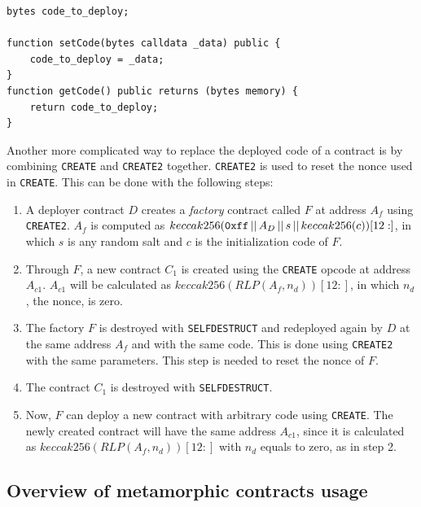\begin{lstlisting}[label={lst:meta-2},caption={Pseudo code of a contract that gives the code to deploy.}]
bytes code_to_deploy;

function setCode(bytes calldata _data) public {
    code_to_deploy = _data;
}
function getCode() public returns (bytes memory) {
    return code_to_deploy;
}
\end{lstlisting}

Another more complicated way to replace the deployed code of a contract is by combining {\tt CREATE} and {\tt CREATE2} together. {\tt CREATE2} is used to reset the nonce used in {\tt CREATE}. This can be done with the following steps:

\begin{enumerate}
    \item A deployer contract $D$ creates a \textit{factory} contract called $F$ at address $A_{f}$ using {\tt CREATE2}. $A_{f}$ is computed as $keccak256({\tt 0xff}\,||\,A_D\,||\,s\,||\,keccak256(c))[12:]$, in which $s$ is any random salt and $c$ is the initialization code of $F$.  

    \item Through $F$, a new contract $C_1$ is created using the {\tt CREATE} opcode at address $A_{c1}$. $A_{c1}$ will be calculated as $keccak256(RLP(A_f,n_d))[12:]$, in which $n_d$, the nonce, is zero.

    \item The factory $F$ is destroyed with {\tt SELFDESTRUCT} and redeployed again by $D$ at the same address $A_f$ and with the same code. This is done using {\tt CREATE2} with the same parameters. This step is needed to reset the nonce of $F$.

    \item The contract $C_1$ is destroyed with {\tt SELFDESTRUCT}.

    \item Now, $F$ can deploy a new contract with arbitrary code using {\tt CREATE}. The newly created contract will have the same address $A_{c1}$, since it is calculated as $keccak256(RLP(A_f,n_d))[12:]$ with $n_d$ equals to zero, as in step 2. 
    
\end{enumerate}

\subsection{Overview of metamorphic contracts usage}

